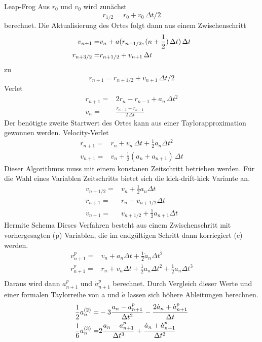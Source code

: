 \documentclass[12pt]{article}
\begin{document}
{Leap-Frog}
Aus $r_0$ und $v_0$ wird zunächst
$$r_{1/2}=r_0+v_0\,\Delta{t}/2$$
berechnet. Die Aktualisierung des Ortes folgt dann aus einem Zwischenschritt
\begin{align*}
    v_{n+1}=&v_n+a(r_{n+1/2},(n+\frac{1}{2})\,\Delta{t})\,\Delta{t}\\
    r_{n+3/2}=&r_{n+1/2}+v_{n+1}\,\Delta{t}
\end{align*}
zu 
$$r_{n+1}=r_{n+1/2}+v_{n+1}\,\Delta{t}/2$$
\newline\newline
{Verlet}
\begin{align*}
    r_{n+1}=&2r_n-r_{n-1}+a_n\,\Delta{t}^2\\
    v_{n}=&\frac{r_{n+1}-r_{n-1}}{2\,\Delta{t}}
\end{align*}
Der benötigte zweite Startwert des Ortes kann aus einer Taylorapproximation gewonnen werden.
\newline\newline
{Velocity-Verlet}
\begin{align*}
    r_{n+1}=&r_n+v_n\,\Delta{t}+\frac{1}{2}a_n\Delta{t}^2\\
    v_{n+1}=&v_n+\frac{1}{2}(a_n+a_{n+1})\,\Delta{t}
\end{align*}
Dieser Algorithmus muss mit einem konstanen Zeitschritt betrieben werden. Für die Wahl eines Variablen Zeitschritts bietet sich die kick-drift-kick Variante an.
\begin{align*}
    v_{n+1/2}=&v_n+\frac{1}{2}a_n\Delta{t}\\
    r_{n+1}=&r_n+v_{n+1/2}\Delta{t}\\
    v_{n+1}=&v_{n+1/2}+\frac{1}{2}a_{n+1}\Delta{t}
\end{align*}
\newline\newline
{Hermite Schema}
Dieses Verfahren besteht aus einem Zwischenschritt mit vorhergesagten (p) Variablen, die im endgültigen Schritt dann korriegiert (c) werden.
\begin{align*}
    v_{n+1}^p=&v_n+a_n\Delta{t}+\frac{1}{2}\dot{a}_n\Delta{t}^2\\
    r_{n+1}^p=&r_n+v_n\Delta{t}+\frac{1}{2}a_n\Delta{t}^2+\frac{1}{2}\dot{a}_n\Delta{t}^3\\
\end{align*}
Daraus wird dann $a_{n+1}^p$ und $\dot{a}_{n+1}^p$ berechnet. Durch Vergleich dieser Werte und einer formalen Taylorreihe von a und $\dot{a}$ lassen sich höhere Ableitungen berechnen.
\begin{align*}
    \frac{1}{2}{a}_n^{(2)}=&-3\frac{a_n-a_{n+1}^p}{\Delta{t}^2}-\frac{2\dot{a}_n+\dot{a}_{n+1}^p}{\Delta{t}}\\
    \frac{1}{6}a_n^{(3)}=&2\frac{a_n-a_{n+1}^p}{\Delta{t}^3}+\frac{\dot{a}_n+\dot{a}_{n+1}^p}{\Delta{t}^2}
\end{align*}
\end{document}
